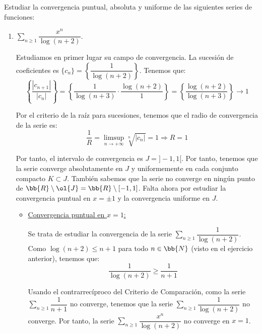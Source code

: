 \begin{ejercicio}
    Estudiar la convergencia puntual, absoluta y uniforme de las siguientes series de funciones:
    \begin{enumerate}
        \item $\sum\limits_{n\geq 1}\dfrac{x^n}{\log(n+2)}$.
        
        Estudiamos en primer lugar su campo de convergencia. La sucesión de coeficientes es
        $\{c_n\} = \left\{\dfrac{1}{\log(n+2)}\right\}$. Tenemos que:
        \begin{equation*}
            \left\{\frac{\left|c_{n+1}\right|}{\left|c_n\right|}\right\}
            = \left\{\frac{1}{\log(n+3)}\cdot \frac{\log(n+2)}{1}\right\}
            = \left\{\frac{\log(n+2)}{\log(n+3)}\right\} \to 1
        \end{equation*}

        Por el criterio de la raíz para sucesiones, tenemos que el radio de convergencia de la serie es:
        \begin{equation*}
            \frac{1}{R} = \limsup_{n\to +\infty}\sqrt[n]{\left|c_n\right|} = 1 \Longrightarrow R = 1
        \end{equation*}

        Por tanto, el intervalo de convergencia es $J=]-1, 1[$. Por tanto, tenemos que la serie converge absolutamente en $J$
        y uniformemente en cada conjunto compacto $K\subset J$. También sabemos que la serie no converge en ningún
        punto de $\bb{R}\setminus \ol{J}=\bb{R}\setminus [-1, 1]$.
        Falta ahora por estudiar la convergencia puntual en $x=\pm 1$ y la convergencia uniforme en $J$.
        \begin{itemize}
            \item \ul{Convergencia puntual en $x=1$:}
            
            Se trata de estudiar la convergencia de la serie $\sum\limits_{n\geq 1}\dfrac{1}{\log(n+2)}$.
            Como $\log(n+2)\leq n+1$ para todo $n\in \bb{N}$ (visto en el ejercicio anterior), tenemos que:
            \begin{equation*}
                \frac{1}{\log(n+2)} \geq \frac{1}{n+1}
            \end{equation*}

            Usando el contrarrecíproco del Criterio de Comparación, como la serie $\sum\limits_{n\geq 1}\dfrac{1}{n+1}$ no converge, tenemos que la serie $\sum\limits_{n\geq 1}\dfrac{1}{\log(n+2)}$ no converge. Por tanto, la serie $\sum\limits_{n\geq 1}\dfrac{x^n}{\log(n+2)}$ no converge en $x=1$.


\end{itemize}
\end{enumerate}
\end{ejercicio}
